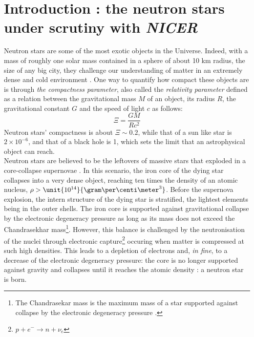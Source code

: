 \documentclass[a4paper, twoside, 12pt]{article}
\numberwithin{equation}{section}
\begin{document}
\section{Introduction : the neutron stars under scrutiny with {\itshape{NICER }}}
\label{sec:1}
\hspace{\parindent}	Neutron stars are some of the most exotic objects in the Universe. Indeed, with a mass of roughly one solar mass contained in a sphere of about 10 km radius, the size of any big city, they challenge our understanding of matter in an extremely dense and cold environment \cite{baade_zwicky} \cite{ScorpiusX-1}. One way to quantify how compact these objects are is through {\itshape{the compactness parameter}}, also called the {\itshape{relativity parameter}} defined as a relation between the gravitational mass $M$ of an object, its radius $R$, the gravitational constant $G$ and the speed of light $c$ as follows: 
\begin{equation}
\Xi = \frac{GM}{Rc^2}
\label{eq:compactness}
\end{equation} 
 Neutron stars' compactness is about $\Xi \sim 0.2$, while that of a sun like star is $2 \times 10^{-6}$, and that of a black hole is 1, which sets the limit that an astrophysical object can reach. \\
 
 Neutron stars are believed to be the leftovers of massive stars that exploded in a core-collapse supernovae \cite{SN_remnants}. In this scenario,  the iron core of the dying star collapses into a very dense object, reaching ten times the density of an atomic nucleus, $\rho > \unit{10^{14}} {\gram \per  \centi \meter^{3}}$. Before the supernova explosion, the intern structure of the dying star is stratified, the lightest elements being in the outer shells. The iron core is supported against gravitational collapse by the electronic degeneracy pressure as long as its mass does not exceed the Chandrasekhar mass\footnote{The Chandrasekar mass is the maximum mass of a star supported against collapse by the electronic degeneracy pressure \cite{Chandrasekhar}.}. However, this balance is challenged by the neutronisation of the nuclei through electronic capture\footnote{$p + e^{-}  \rightarrow n + \nu_e$ } occuring when matter is compressed at such high densities. This leads to a depletion of electrons and,{ \itshape{in fine}}, to a  decrease of the electronic degeneracy pressure: the core is no longer supported against gravity and collapses until it reaches the atomic density : a neutron star is born. \\
\end{document}
